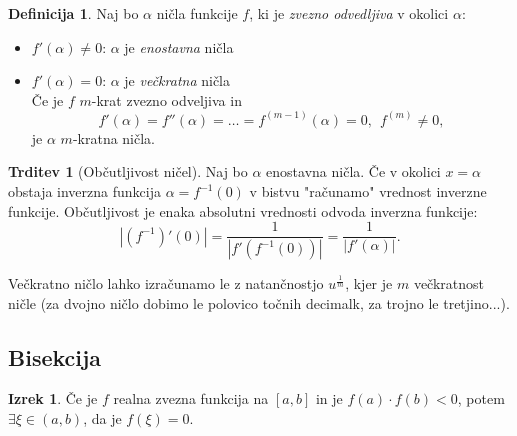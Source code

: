 \documentclass[11pt]{article}
\theoremstyle{definition}
\newtheorem{definicija}{Definicija}[section]
\newtheorem{trditev}{Trditev}
\newtheorem{izrek}{Izrek}
\begin{document}
\begin{definicija}

Naj bo $\alpha$ ničla funkcije $f$, ki je \textit{zvezno odvedljiva} v okolici $\alpha$:
\begin{itemize}

	\item $f'(\alpha) \neq 0$: $\alpha$ je \textit{enostavna} ničla
	
	\item $f'(\alpha) = 0$: $\alpha$ je \textit{večkratna} ničla \\
	
	Če je $f$ $m$-krat zvezno odveljiva in
	$$f'(\alpha) = f''(\alpha) = \ldots = f^{(m-1)}(\alpha) = 0,~~f^{(m)} \neq 0,$$
	je $\alpha$ $m$-kratna ničla.

\end{itemize}

\end{definicija}
\vspace{0.5cm}

\begin{trditev}[Občutljivost ničel]

Naj bo $\alpha$ enostavna ničla. Če v okolici $x = \alpha$ obstaja inverzna funkcija $\alpha = f^{-1}(0)$ v bistvu "računamo" vrednost inverzne funkcije. Občutljivost je enaka absolutni vrednosti odvoda inverzna funkcije:
$$|(f^{-1})'(0)| = \frac{1}{|f'(f^{-1}(0))|} = \frac{1}{|f'(\alpha)|}.$$

Večkratno ničlo lahko izračunamo le z natančnostjo $u^{\frac{1}{m}}$, kjer je $m$ večkratnost ničle (za dvojno ničlo dobimo le polovico točnih decimalk, za trojno le tretjino...). 

\end{trditev}
\vspace{0.5cm}


\subsection{Bisekcija}
\vspace{0.5cm}

\begin{izrek}

Če je $f$ realna zvezna funkcija na $[a, b]$ in je $f(a) \cdot f(b) < 0$, potem $\exists \xi \in (a, b)$, da je $f(\xi) = 0$.

\end{izrek}
\vspace{3cm}
\end{document}
